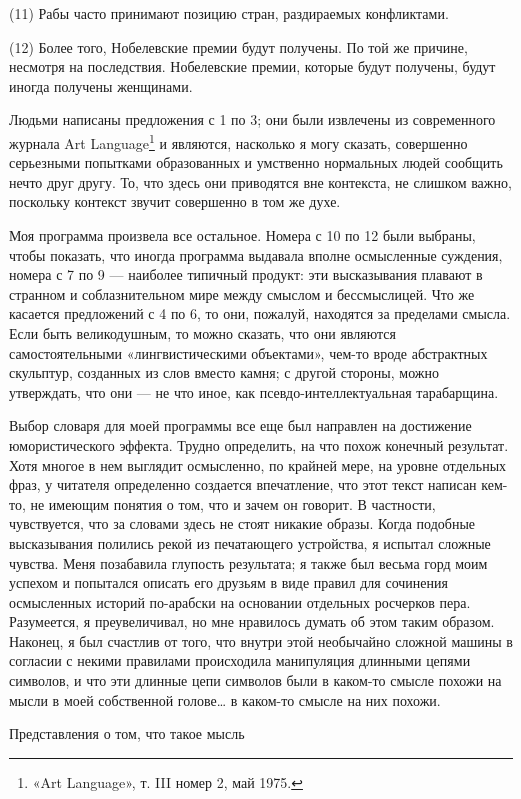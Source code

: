 \documentclass[../main.tex]{subfiles}
\begin{document}
(11) Рабы часто принимают позицию стран, раздираемых конфликтами.

(12) Более того, Нобелевские премии будут получены. По той же причине, несмотря на последствия. Нобелевские премии, которые будут получены, будут иногда получены женщинами.

Людьми написаны предложения с 1 по 3; они были извлечены из современного журнала Art Language\footnote{«Art Language», т. III номер 2, май 1975.} и являются, насколько я могу сказать, совершенно серьезными попытками образованных и умственно нормальных людей сообщить нечто друг другу. То, что здесь они приводятся вне контекста, не слишком важно, поскольку контекст звучит совершенно в том же духе.

Моя программа произвела все остальное. Номера с 10 по 12 были выбраны, чтобы показать, что иногда программа выдавала вполне осмысленные суждения, номера с 7 по 9 --- наиболее типичный продукт: эти высказывания плавают в странном и соблазнительном мире между смыслом и бессмыслицей. Что же касается предложений с 4 по 6, то они, пожалуй, находятся за пределами смысла. Если быть великодушным, то можно сказать, что они являются самостоятельными «лингвистическими объектами», чем-то вроде абстрактных скульптур, созданных из слов вместо камня; с другой стороны, можно утверждать, что они --- не что иное, как псевдо-интеллектуальная тарабарщина.

Выбор словаря для моей программы все еще был направлен на достижение юмористического эффекта. Трудно определить, на что похож конечный результат. Хотя многое в нем выглядит осмысленно, по крайней мере, на уровне отдельных фраз, у читателя определенно создается впечатление, что этот текст написан кем-то, не имеющим понятия о том, что и зачем он говорит. В частности, чувствуется, что за словами здесь не стоят никакие образы. Когда подобные высказывания полились рекой из печатающего устройства, я испытал сложные чувства. Меня позабавила глупость результата; я также был весьма горд моим успехом и попытался описать его друзьям в виде правил для сочинения осмысленных историй по-арабски на основании отдельных росчерков пера. Разумеется, я преувеличивал, но мне нравилось думать об этом таким образом. Наконец, я был счастлив от того, что внутри этой необычайно сложной машины в согласии с некими правилами происходила манипуляция длинными цепями символов, и что эти длинные цепи символов были в каком-то смысле похожи на мысли в моей собственной голове\ldots{} в каком-то смысле на них похожи.

Представления о том, что такое мысль
\end{document}
